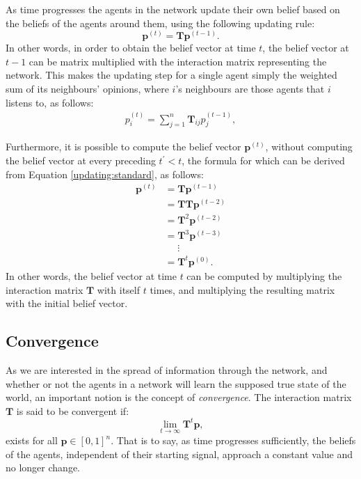 \documentclass[a4paper, 12pt]{report}
\newcommand{\T}{\bm{T}}
\newcommand{\Tij}{\T_{ij}}
\newcommand{\beli}[3][2]{p_{#2}^{(#3)}}
\begin{document}
\noindent As time progresses the agents in the network update their own belief based on the beliefs of the agents around them, using the following updating rule:
\begin{equation}
    \label{updating:standard}
    \bm{p}^{(t)} = \T\bm{p}^{(t-1)}.
\end{equation}
In other words, in order to obtain the belief vector at time $t$, the belief vector at $t-1$ can be matrix multiplied with the interaction matrix representing the network. This makes the updating step for a single agent simply the weighted sum of its neighbours' opinions, where $i$'s neighbours are those agents that $i$ listens to, as follows:
\begin{align*}
    \beli{i}{t} = \sum_{j=1}^{n}\Tij\beli{j}{t-1},
\end{align*}

\newpage

\noindent Furthermore, it is possible to compute the belief vector $\bm{p}^{(t)}$, without computing the belief vector at every preceding $t^\prime < t$, the formula for which can be derived from Equation \ref{updating:standard}, as follows:
\begin{align*}
    \bm{p}^{(t)} &= \T\bm{p}^{(t-1)} \\
    &= \T\T\bm{p}^{(t-2)}\\
    &= \T^2\bm{p}^{(t-2)}\\
    &= \T^3\bm{p}^{(t-3)} \\
    & \ \ \ \ \ \  \vdots \\
    &= \T^{t}\bm{p}^{(0)}.
\end{align*}
In other words, the belief vector at time $t$ can be computed by multiplying the interaction matrix $\T$ with itself $t$ times, and multiplying the resulting matrix with the initial belief vector.


\subsection{Convergence}
\label{convergence}
As we are interested in the spread of information through the network, and whether or not the agents in a network will learn the supposed true state of the world, an important notion is the concept of \emph{convergence}. The interaction matrix $\T$ is said to be convergent if:
\begin{equation*}
    \lim_{t\to\infty} \T^t\bm{p},
\end{equation*}
exists for all $\bm{p} \in [0, 1]^n$. That is to say, as time progresses sufficiently, the beliefs of the agents, independent of their starting signal, approach a constant value and no longer change.
\end{document}
